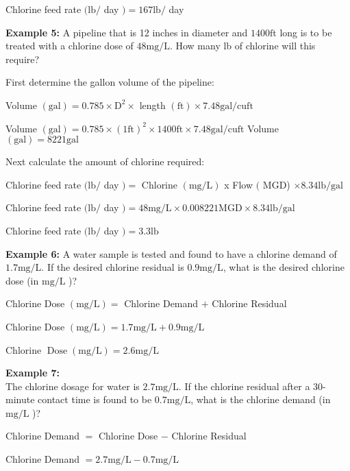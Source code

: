 \documentclass{article}
\begin{document}
Chlorine feed rate $(\mathrm{lb} /$ day $)=167 \mathrm{lb} /$ day

\textbf{Example 5:} A pipeline that is 12 inches in diameter and $1400 \mathrm{ft}$ long is to be treated with a chlorine dose of $48 \mathrm{mg} / \mathrm{L}$. How many lb of chlorine will this require?

First determine the gallon volume of the pipeline:

Volume $(\mathrm{gal})=0.785 \times \mathrm{D}^{2} \times$ length $(\mathrm{ft}) \times 7.48 \mathrm{gal} / \mathrm{cu} \mathrm{ft}$

Volume $(\mathrm{gal})=0.785 \times(1 \mathrm{ft})^{2} \times 1400 \mathrm{ft} \times 7.48 \mathrm{gal} / \mathrm{cu} \mathrm{ft}$ Volume $(\mathrm{gal})=8221 \mathrm{gal}$

Next calculate the amount of chlorine required:

Chlorine feed rate $(\mathrm{lb} /$ day $)=$ Chlorine $(\mathrm{mg} / \mathrm{L})$ x Flow $($ MGD) $\times 8.34 \mathrm{lb} / \mathrm{gal}$

Chlorine feed rate $(\mathrm{lb} /$ day $)=48 \mathrm{mg} / \mathrm{L} \times 0.008221 \mathrm{MGD} \times 8.34 \mathrm{lb} / \mathrm{gal}$

Chlorine feed rate $(\mathrm{lb} /$ day $)=3.3 \mathrm{lb}$

\textbf{Example 6:} A water sample is tested and found to have a chlorine demand of $1.7 \mathrm{mg} / \mathrm{L}$. If the desired chlorine residual is $0.9 \mathrm{mg} / \mathrm{L}$, what is the desired chlorine dose (in $\mathrm{mg} / \mathrm{L}$ )?

Chlorine Dose $(\mathrm{mg} / \mathrm{L})=$ Chlorine Demand $+$ Chlorine Residual

Chlorine Dose $(\mathrm{mg} / \mathrm{L})=1.7 \mathrm{mg} / \mathrm{L}+0.9 \mathrm{mg} / \mathrm{L}$

Chlorine $\operatorname{Dose}(\mathrm{mg} / \mathrm{L})=2.6 \mathrm{mg} / \mathrm{L}$

\textbf{Example 7:}\\
The chlorine dosage for water is $2.7 \mathrm{mg} / \mathrm{L}$. If the chlorine residual after a 30-minute contact time is found to be $0.7 \mathrm{mg} / \mathrm{L}$, what is the chlorine demand (in $\mathrm{mg} / \mathrm{L}$ )?

Chlorine Demand $=$ Chlorine Dose $-$ Chlorine Residual

Chlorine Demand $=2.7 \mathrm{mg} / \mathrm{L}-0.7 \mathrm{mg} / \mathrm{L}$
\end{document}
